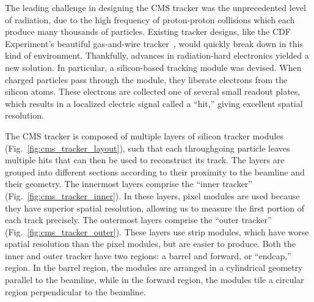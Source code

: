 The leading challenge in designing the CMS tracker was the unprecedented level of radiation, due to the high frequency of proton-proton collisions which each produce many thousands of particles. 
Existing tracker designs, like the CDF Experiment's beautiful gas-and-wire tracker~\cite{CDF:2003xbh}, would quickly break down\footnotemark{} in this kind of environment.
Thankfully, advances in radiation-hard electronics yielded a new solution. 
In particular, a silicon-based tracking module was devised. 
When charged particles pass through the module, they liberate electrons from the silicon atoms. 
These electrons are collected one of several small readout plates, which results in a localized electric signal called a ``hit,'' giving excellent spatial resolution. 

The CMS tracker is composed of multiple layers of silicon tracker modules (Fig.~\ref{fig:cms_tracker_layout}), such that each throughgoing particle leaves multiple hits that can then be used to reconstruct its track. 
The layers are grouped into different sections according to their proximity to the beamline and their geometry. 
The innermost layers comprise the ``inner tracker'' (Fig.~\ref{fig:cms_tracker_inner}). 
In these layers, pixel modules are used because they have superior spatial resolution, allowing us to measure the first portion of each track precisely. 
The outermost layers comprise the ``outer tracker'' (Fig.~\ref{fig:cms_tracker_outer}). 
These layers use strip modules, which have worse spatial resolution than the pixel modules, but are easier to produce. 
Both the inner and outer tracker have two regions: a barrel and forward, or ``endcap,'' region. 
In the barrel region, the modules are arranged in a cylindrical geometry parallel to the beamline, while in the forward region, the modules tile a circular region perpendicular to the beamline. 

